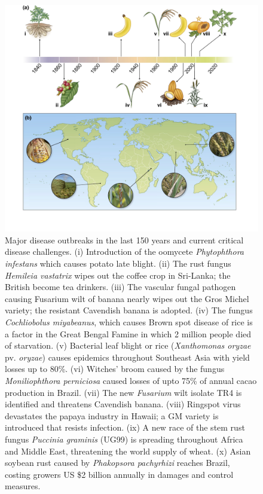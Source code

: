 \documentclass[11pt,dvipsnames,ignorenonframetext,aspectratio=169]{beamer}
\begin{document}
\begin{frame}{}
\protect\hypertarget{section-1}{}
\begin{figure}
\includegraphics[width=0.4\linewidth]{../images/crop_pandemic_history} \caption{Major disease outbreaks in the last 150 years and current critical disease challenges. (i) Introduction of the oomycete \textit{Phytophthora infestans} which causes potato late blight. (ii) The rust fungus \textit{Hemileia vastatrix} wipes out the coffee crop in Sri-Lanka; the British become tea drinkers. (iii) The vascular fungal pathogen causing Fusarium wilt of banana nearly wipes out the Gros Michel variety; the resistant Cavendish banana is adopted. (iv) The fungus \textit{Cochliobolus miyabeanus}, which causes Brown spot disease of rice is a factor in the Great Bengal Famine in which 2 million people died of starvation. (v) Bacterial leaf blight or rice (\textit{Xanthomonas oryzae} pv. \textit{oryzae}) causes epidemics throughout Southeast Asia with yield losses up to 80\%. (vi) Witches' broom caused by the fungus \textit{Moniliophthora perniciosa} caused losses of upto 75\% of annual cacao production in Brazil. (vii) The new \textit{Fusarium} wilt isolate TR4 is identified and threatens Cavendish banana. (viii) Ringspot virus devastates the papaya industry in Hawaii; a GM variety is introduced that resists infection. (ix) A new race of the stem rust fungus \textit{Puccinia graminis} (UG99) is spreading throughout Africa and Middle East, threatening the world supply of wheat. (x) Asian soybean rust caused by \textit{Phakopsora pachyrhizi} reaches Brazil, costing growers US \$2 billion annually in damages and control measures.}\label{fig:crop-pandemic-history}
\end{figure}
\end{frame}
\end{document}
